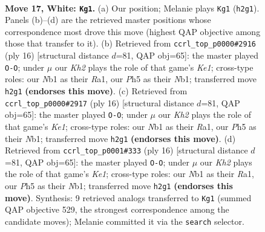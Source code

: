 \documentclass[11pt]{article}
\begin{document}
\clearpage

\begin{figure}[p]\centering
\begin{subfigure}{0.46\textwidth}\centering
\resizebox{\linewidth}{!}{%
\newchessgame
\chessboard[
  setfen={nrb2rk1/p3npbp/3q4/1pp1p2P/8/3PP3/PP3PBK/RNBQNR2 w - - 0 17},
  showmover=false,
  pgfstyle=straightmove, color=movearrow, markmove={h2-g1}
]}
\caption{}
\end{subfigure}\hfill
\begin{subfigure}{0.46\textwidth}\centering
\resizebox{\linewidth}{!}{%
\newchessgame
\chessboard[
  setfen={rnbq1rk1/pp2ppbp/1n4p1/2pP4/4P3/6P1/PP2NPBP/RNBQK2R w KQ - 1 9},
  showmover=false,
  pgfstyle=straightmove, color=movearrow, markmove={e1-g1}
]}
\caption{}
\end{subfigure}
\\[4pt]
\begin{subfigure}{0.46\textwidth}\centering
\resizebox{\linewidth}{!}{%
\newchessgame
\chessboard[
  setfen={rnbq1rk1/pp2ppbp/1n4p1/2pP4/4P3/6P1/PP2NPBP/RNBQK2R w KQ - 1 9},
  showmover=false,
  pgfstyle=straightmove, color=movearrow, markmove={e1-g1}
]}
\caption{}
\end{subfigure}\hfill
\begin{subfigure}{0.46\textwidth}\centering
\resizebox{\linewidth}{!}{%
\newchessgame
\chessboard[
  setfen={rnbq1rk1/pp2ppbp/1n4p1/2pP4/4P3/6P1/PP2NPBP/RNBQK2R w KQ - 1 9},
  showmover=false,
  pgfstyle=straightmove, color=movearrow, markmove={e1-g1}
]}
\caption{}
\end{subfigure}
\caption{\textbf{Move 17, White: \texttt{Kg1}.} (a) Our position; Melanie plays \texttt{Kg1} (\texttt{h2g1}). Panels (b)--(d) are the retrieved master positions whose correspondence most drove this move (highest QAP objective among those that transfer to it). (b) Retrieved from \texttt{ccrl\_top\_p0000\#2916} (ply 16) [structural distance $d$=81, QAP obj=65]: the master played \texttt{O-O}; under $\mu$ our \emph{Kh2} plays the role of that game's \emph{Ke1}; cross-type roles: our \emph{N}b1 as their \emph{R}a1, our \emph{P}h5 as their \emph{N}b1; transferred move \texttt{h2g1} \textbf{(endorses this move)}. (c) Retrieved from \texttt{ccrl\_top\_p0000\#2917} (ply 16) [structural distance $d$=81, QAP obj=65]: the master played \texttt{O-O}; under $\mu$ our \emph{Kh2} plays the role of that game's \emph{Ke1}; cross-type roles: our \emph{N}b1 as their \emph{R}a1, our \emph{P}h5 as their \emph{N}b1; transferred move \texttt{h2g1} \textbf{(endorses this move)}. (d) Retrieved from \texttt{ccrl\_top\_p0001\#333} (ply 16) [structural distance $d$=81, QAP obj=65]: the master played \texttt{O-O}; under $\mu$ our \emph{Kh2} plays the role of that game's \emph{Ke1}; cross-type roles: our \emph{N}b1 as their \emph{R}a1, our \emph{P}h5 as their \emph{N}b1; transferred move \texttt{h2g1} \textbf{(endorses this move)}. Synthesis: 9 retrieved analogs transferred to \texttt{Kg1} (summed QAP objective 529, the strongest correspondence among the candidate moves); Melanie committed it via the \texttt{search} selector.}
\label{fig:thought-m32}
\end{figure}
\end{document}
